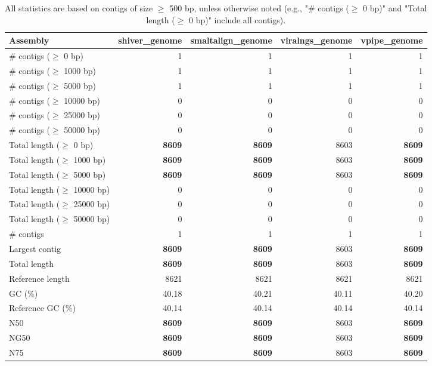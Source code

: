 \documentclass[12pt,a4paper]{article}
\begin{document}
\begin{table}[ht]
\begin{center}
\caption{All statistics are based on contigs of size $\geq$ 500 bp, unless otherwise noted (e.g., "\# contigs ($\geq$ 0 bp)" and "Total length ($\geq$ 0 bp)" include all contigs).}
\begin{tabular}{|l*{4}{|r}|}
\hline
Assembly & shiver\_genome & smaltalign\_genome & viralngs\_genome & vpipe\_genome \\ \hline
\# contigs ($\geq$ 0 bp) & 1 & 1 & 1 & 1 \\ \hline
\# contigs ($\geq$ 1000 bp) & 1 & 1 & 1 & 1 \\ \hline
\# contigs ($\geq$ 5000 bp) & 1 & 1 & 1 & 1 \\ \hline
\# contigs ($\geq$ 10000 bp) & 0 & 0 & 0 & 0 \\ \hline
\# contigs ($\geq$ 25000 bp) & 0 & 0 & 0 & 0 \\ \hline
\# contigs ($\geq$ 50000 bp) & 0 & 0 & 0 & 0 \\ \hline
Total length ($\geq$ 0 bp) & {\bf 8609} & {\bf 8609} & 8603 & {\bf 8609} \\ \hline
Total length ($\geq$ 1000 bp) & {\bf 8609} & {\bf 8609} & 8603 & {\bf 8609} \\ \hline
Total length ($\geq$ 5000 bp) & {\bf 8609} & {\bf 8609} & 8603 & {\bf 8609} \\ \hline
Total length ($\geq$ 10000 bp) & 0 & 0 & 0 & 0 \\ \hline
Total length ($\geq$ 25000 bp) & 0 & 0 & 0 & 0 \\ \hline
Total length ($\geq$ 50000 bp) & 0 & 0 & 0 & 0 \\ \hline
\# contigs & 1 & 1 & 1 & 1 \\ \hline
Largest contig & {\bf 8609} & {\bf 8609} & 8603 & {\bf 8609} \\ \hline
Total length & {\bf 8609} & {\bf 8609} & 8603 & {\bf 8609} \\ \hline
Reference length & 8621 & 8621 & 8621 & 8621 \\ \hline
GC (\%) & 40.18 & 40.21 & 40.11 & 40.20 \\ \hline
Reference GC (\%) & 40.14 & 40.14 & 40.14 & 40.14 \\ \hline
N50 & {\bf 8609} & {\bf 8609} & 8603 & {\bf 8609} \\ \hline
NG50 & {\bf 8609} & {\bf 8609} & 8603 & {\bf 8609} \\ \hline
N75 & {\bf 8609} & {\bf 8609} & 8603 & {\bf 8609} \\ \hline

\end{tabular}
\end{center}
\end{table}
\end{document}
